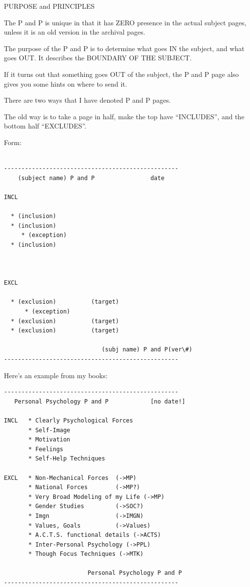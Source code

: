 \documentclass[oneside]{book}
\begin{document}
PURPOSE and PRINCIPLES

The P and P is unique in that it has ZERO presence in the actual subject
pages, unless it is an old version in the archival pages.

The purpose of the P and P is to determine what goes IN the subject, and
what goes OUT. It describes the BOUNDARY OF THE SUBJECT.

If it turns out that something goes OUT of the subject, the P and P page
also gives you some hints on where to send it.

There are two ways that I have denoted P and P pages.

The old way is to take a page in half, make the top have ``INCLUDES'',
and the bottom half ``EXCLUDES''.

Form:
\begin{verbatim}

--------------------------------------------------
    (subject name) P and P                date

INCL

  * (inclusion)
  * (inclusion)
     * (exception)
  * (inclusion)



EXCL

  * (exclusion)          (target)
      * (exception)
  * (exclusion)          (target)
  * (exclusion)          (target)

                            (subj name) P and P(ver\#)
--------------------------------------------------
\end{verbatim}

Here's an example from my books:

\begin{verbatim}
--------------------------------------------------
   Personal Psychology P and P            [no date!]

INCL   * Clearly Psychological Forces
       * Self-Image
       * Motivation
       * Feelings
       * Self-Help Techniques

EXCL   * Non-Mechanical Forces  (->MP)
       * National Forces        (->MP?)
       * Very Broad Modeling of my Life (->MP)
       * Gender Studies         (->SOC?)
       * Imgn                   (->IMGN)
       * Values, Goals          (->Values)
       * A.C.T.S. functional details (->ACTS)
       * Inter-Personal Psychology (->PPL)
       * Though Focus Techniques (->MTK)

                        Personal Psychology P and P
--------------------------------------------------
\end{verbatim}
\end{document}
